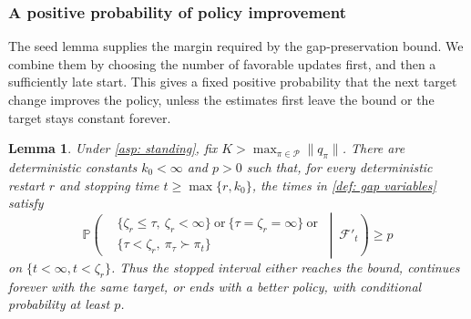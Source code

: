 \documentclass[twoside,11pt]{article}
\newtheorem{lemma}[lemma]{Lemma}
\DeclareRobustCommand{\reviewbarstart}{%
  \ifhmode %
    \vadjust{\vbox to 0pt{%
      \vskip-\ht\strutbox %
      \vskip-\dp\strutbox %
      \cbstart[\changebarwidth] %
      \vss %
    }}%
  \else %
    \cbstart[\changebarwidth]%
  \fi %
} %
\providecommand{\DIFadd}[1]{#1} %
\providecommand{\DIFaddbegin}{\reviewbarstart} %
\providecommand{\DIFaddend}{\protect\cbend} %
\def\DIFadd#1{#1}%
\def\DIFaddbegin{}%
\def\DIFaddend{}%
\begin{document}
 \DIFaddbegin \subsubsection{\DIFadd{A positive probability of policy improvement}}
\DIFadd{The seed lemma supplies the margin required by the gap-preservation bound. We combine them by choosing the number of favorable updates first, and then a sufficiently late start. This gives a fixed positive probability that the next target change improves the policy, unless the estimates first leave the bound or the target stays constant forever}\DIFaddend .

 \DIFaddbegin \begin{lemma}
\label{thm: fixed prob that bad actions dont become greedy}
\DIFadd{Under \autoref{asp: standing}, fix $K>\max_{\pi\in\mathcal P}\|q_\pi\|$. There are deterministic constants $k_0<\infty$ and $p>0$ such that, for every deterministic restart $r$ and stopping time $t\ge\max\{r,k_0\}$, the times in \autoref{def: gap variables} satisfy
}\begin{equation}
\DIFadd{\label{eq:progress}
\mathbb P\!\left(
\begin{aligned}
&\{\zeta_r\le\tau,\ \zeta_r<\infty\}\ \text{or}\ \{\tau=\zeta_r=\infty\}\ \text{or}\\
&\{\tau<\zeta_r,\ \pi_\tau\succ\pi_t\}
\end{aligned}
\ \middle|\ \mathcal F'_t\right)\ge p
}\end{equation}\DIFaddend 
 \DIFaddbegin \DIFadd{on $\{t<\infty,t<\zeta_r\}$. Thus the stopped interval either reaches the bound, continues forever with the same target, or ends with a better policy, with conditional probability at least $p$.
}\end{lemma}
\end{document}
